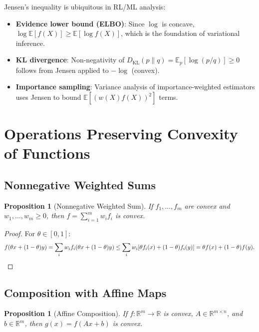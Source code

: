 \documentclass[11pt,a4paper]{article}
\newtheorem{proposition}[theorem]{Proposition}
\theoremstyle{definition}
\theoremstyle{remark}
\newcommand{\R}{\mathbb{R}}
\newcommand{\E}{\mathbb{E}}
\begin{document}
\begin{rlconnection}
Jensen's inequality is ubiquitous in RL/ML analysis:
\begin{itemize}
  \item \textbf{Evidence lower bound (ELBO)}: Since $\log$ is concave,
        $\log \E[f(X)] \ge \E[\log f(X)]$, which is the foundation of variational
        inference.
  \item \textbf{KL divergence}: Non-negativity of $D_{\text{KL}}(p\|q) =
        \E_p[\log(p/q)] \ge 0$ follows from Jensen applied to $-\log$ (convex).
  \item \textbf{Importance sampling}: Variance analysis of importance-weighted
        estimators uses Jensen to bound $\E[(w(X) f(X))^2]$ terms.
\end{itemize}
\end{rlconnection}

\section{Operations Preserving Convexity of Functions}

\subsection{Nonnegative Weighted Sums}

\begin{proposition}[Nonnegative Weighted Sum]
\label{prop:nonneg-sum}
If $f_1, \ldots, f_m$ are convex and $w_1, \ldots, w_m \ge 0$, then $f = \sum_{i=1}^m
w_i f_i$ is convex.
\end{proposition}

\begin{proof}
For $\theta \in [0,1]$:
\[
  f(\theta x + (1-\theta) y) = \sum_i w_i f_i(\theta x + (1-\theta)y)
  \le \sum_i w_i [\theta f_i(x) + (1-\theta) f_i(y)]
  = \theta f(x) + (1-\theta) f(y). \qedhere
\]
\end{proof}

\subsection{Composition with Affine Maps}

\begin{proposition}[Affine Composition]
\label{prop:affine-comp}
If $f : \R^m \to \R$ is convex, $A \in \R^{m \times n}$, and $b \in \R^m$, then
$g(x) = f(Ax + b)$ is convex.
\end{proposition}
\end{document}
